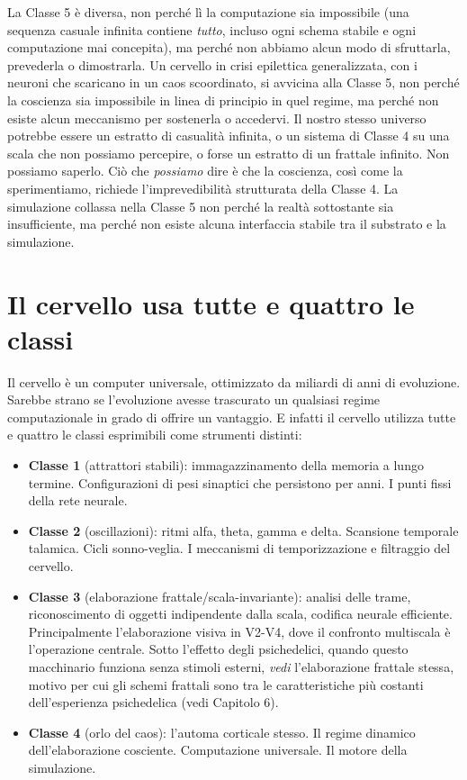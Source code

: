 \documentclass[11pt, twoside, openright]{book}
\begin{document}
La Classe 5 è diversa, non perché lì la computazione sia impossibile (una sequenza casuale infinita contiene \textit{tutto}, incluso ogni schema stabile e ogni computazione mai concepita), ma perché non abbiamo alcun modo di sfruttarla, prevederla o dimostrarla. Un cervello in crisi epilettica generalizzata, con i neuroni che scaricano in un caos scoordinato, si avvicina alla Classe 5, non perché la coscienza sia impossibile in linea di principio in quel regime, ma perché non esiste alcun meccanismo per sostenerla o accedervi. Il nostro stesso universo potrebbe essere un estratto di casualità infinita, o un sistema di Classe 4 su una scala che non possiamo percepire, o forse un estratto di un frattale infinito. Non possiamo saperlo. Ciò che \textit{possiamo} dire è che la coscienza, così come la sperimentiamo, richiede l'imprevedibilità strutturata della Classe 4. La simulazione collassa nella Classe 5 non perché la realtà sottostante sia insufficiente, ma perché non esiste alcuna interfaccia stabile tra il substrato e la simulazione.

\section*{Il cervello usa tutte e quattro le classi}

Il cervello è un computer universale, ottimizzato da miliardi di anni di evoluzione. Sarebbe strano se l'evoluzione avesse trascurato un qualsiasi regime computazionale in grado di offrire un vantaggio. E infatti il cervello utilizza tutte e quattro le classi esprimibili come strumenti distinti:

\begin{itemize}
  \item \textbf{Classe 1} (attrattori stabili): immagazzinamento della memoria a lungo termine. Configurazioni di pesi sinaptici che persistono per anni. I punti fissi della rete neurale.
  \item \textbf{Classe 2} (oscillazioni): ritmi alfa, theta, gamma e delta. Scansione temporale talamica. Cicli sonno-veglia. I meccanismi di temporizzazione e filtraggio del cervello.
  \item \textbf{Classe 3} (elaborazione frattale/\allowbreak{}scala-invariante): analisi delle trame, riconoscimento di oggetti indipendente dalla scala, codifica neurale efficiente. Principalmente l'elaborazione visiva in V2-V4, dove il confronto multiscala è l'operazione centrale. Sotto l'effetto degli psichedelici, quando questo macchinario funziona senza stimoli esterni, \textit{vedi} l'elaborazione frattale stessa, motivo per cui gli schemi frattali sono tra le caratteristiche più costanti dell'esperienza psichedelica (vedi Capitolo 6).
  \item \textbf{Classe 4} (orlo del caos): l'automa corticale stesso. Il regime dinamico dell'elaborazione cosciente. Computazione universale. Il motore della simulazione.
\end{itemize}
\end{document}
